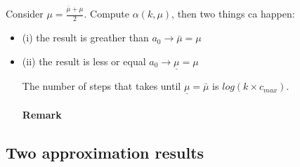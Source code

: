 \documentclass[main]{subfiles}
\begin{document}
Consider $\mu = \frac{\bar{\mu} + \underline{\mu}}{2}$. Compute $\alpha(k, \mu)$, then two things ca happen:
\begin{itemize}
\item (i) the result is greather than $a_{0} \rightarrow \bar{\mu} = \mu$
\item (ii) the result is less or equal $a_{0} \rightarrow \underline{\mu} = \mu$

The number of steps that takes until $\underline{\mu} = \bar{\mu}$ is $log(k \times c_{max})$.

\paragraph{Remark}
\end{itemize}

\subsection{Two approximation results}
\end{document}
